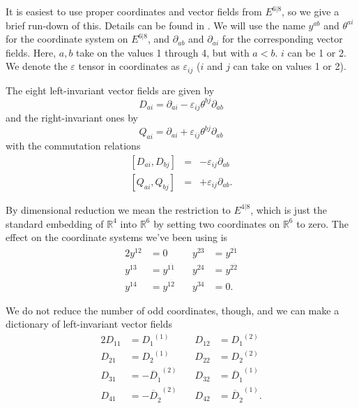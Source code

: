 \documentclass[twoside]{amsart}
\newcommand{\RR}{\ensuremath{\mathbb{R}}}
\renewcommand{\epsilon}{\varepsilon}
\newcommand{\enm}[1]{\ensuremath{#1}}
\newcommand{\superijk}[3]{\enm{{#1}^{#2|#3}}}
\newcommand{\rrij}[2]{\superijk{E}{#1}{#2}}
\renewcommand{\bar}[1]{\overline{#1}}
\newcommand{\di}[1]{\enm{\partial_{#1}}}
\newcommand{\cjsub}[2]{\enm{\bar#1{} _{{\dot{#2 }}}}} %
\newcommand{\odi}[1]{\enm{D_{#1}}}
\newcommand{\odicj}[1]{\enm{\cjsub{D}{#1}}}
\newcommand{\oqi}[1]{\enm{Q_{#1}}}
\newcommand{\even}[3]{\enm{{#1}^{#2 \dot{#3}}}}
\newcommand{\onetwoij}[2]{\enm{#1^{(#2)}}}
\renewcommand{\epsilon}{\varepsilon}
\newcommand{\susols}{\cite{susols}}
\begin{document}
\proof
It is easiest to use proper coordinates and vector fields from
\rrij{6}{8}, so we give a brief run-down of this.  Details can be
found in \susols.
We will use the name \( y^{ab} \) and \( \theta^{ai} \) for the
coordinate system on \rrij{6}{8}, and \( \di{ab} \) and \(
\di{ai} \) for the corresponding vector fields.  Here, \( a, b \)
take
on the values 1 through 4, but with \( a<b \).  \( i \) can be 1 or
2. We denote the \(\epsilon\) tensor in coordinates as
\(\epsilon_{ij}\) (\( i \) and \( j \) can take on values 1 or 2).

The eight left-invariant vector fields are given by
\begin{equation}
    \odi{ai} = \di{ai} - \epsilon_{ij}\theta^{bj}\di{ab}
    \label{eq:defofdinm68}
\end{equation}
and the right-invariant ones by
\begin{equation}
    \oqi{ai} = \di{ai} + \epsilon_{ij}\theta^{bj}\di{ab}
    \label{eq:defofqinm68}
\end{equation}
with the commutation relations
\begin{eqnarray*}
    \left[\odi{ai}, \odi{bj}\right] & = & -\epsilon_{ij}\di{ab}  \\
    \left[\oqi{ai}, \oqi{bj}\right] & = & +\epsilon_{ij}\di{ab}.
\end{eqnarray*}

By dimensional reduction we mean the restriction to \rrij{4}{8},
which is just the standard embedding of \(\RR^4\) into \(\RR^6\) by
setting two coordinates on \(\RR^6\) to
zero.  The effect on the coordinate systems we've been using is
\begin{alignat}{2}
    y^{12} & = 0
    & \quad y^{23} & = \even{y}{2}{1}\nonumber\\
    y^{13} & = \even{y}{1}{1}
    & \quad y^{24} & = \even{y}{2}{2}\label{eq:dimred2}\\
    y^{14} & = \even{y}{1}{2}
    & \quad y^{34} & = 0.\nonumber
\end{alignat}

We do not reduce the number of odd coordinates, though, and we can
make a dictionary of left-invariant vector fields
\begin{alignat}{2}
    D_{11} & = \onetwoij{\odi{1}}{1}
    & \quad D_{12} & = \onetwoij{\odi{1}}{2}\nonumber\\
    D_{21} & = \onetwoij{\odi{2}}{1}
    & \quad D_{22} & = \onetwoij{\odi{2}}{2} \label{eq:dimred}\\
    D_{31} & = -\onetwoij{\odicj{1}}{2}
    & \quad D_{32} & = \onetwoij{\odicj{1}}{1}\nonumber\\
    D_{41} & = -\onetwoij{\odicj{2}}{2}
    & \quad D_{42} & = \onetwoij{\odicj{2}}{1}\nonumber.
\end{alignat}
\end{document}
